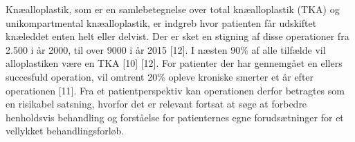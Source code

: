 Knæalloplastik, som er en samlebetegnelse over total knæalloplastik (TKA) og unikompartmental knæalloplastik, er indgreb hvor patienten får udskiftet knæleddet enten helt eller delvist. Der er sket en stigning af disse operationer fra 2.500 i år 2000, til over 9000 i år 2015 [12].  I næsten 90\% af alle tilfælde vil alloplastiken være en TKA [10] [12].
For patienter der har gennemgået en ellers succesfuld operation, vil omtrent 20\% opleve kroniske smerter et år efter operationen [11]. Fra et patientperspektiv kan operationen derfor betragtes som en risikabel satsning, hvorfor det er relevant fortsat at søge at forbedre henholdsvis behandling og forståelse for patienternes egne forudsætninger for et vellykket behandlingsforløb. 
